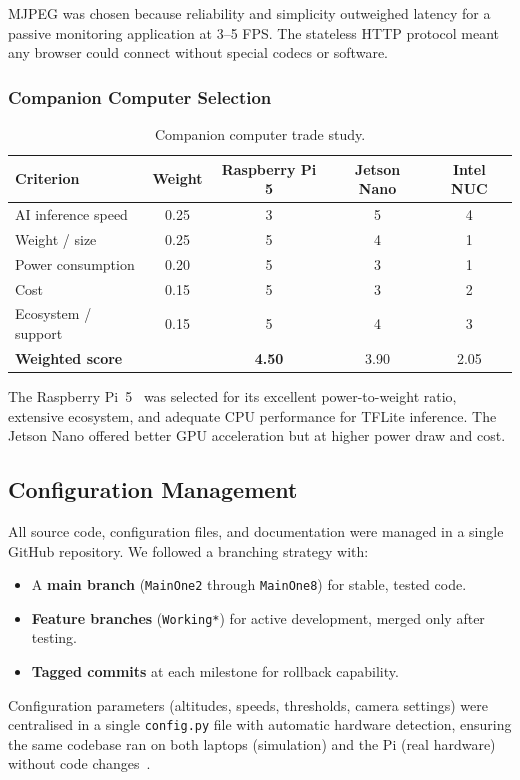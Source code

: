 MJPEG was chosen because reliability and simplicity outweighed latency for a passive monitoring application at 3--5 FPS. The stateless HTTP protocol meant any browser could connect without special codecs or software.

\subsubsection{Companion Computer Selection}

\begin{table}[htbp]
\centering
\compactTable
\caption{Companion computer trade study.}
\label{tab:companion_trade}
\begin{tabular}{l c c c c}
\toprule
\textbf{Criterion} & \textbf{Weight} & \textbf{Raspberry Pi 5} & \textbf{Jetson Nano} & \textbf{Intel NUC} \\
\midrule
AI inference speed & 0.25 & 3 & 5 & 4 \\
Weight / size & 0.25 & 5 & 4 & 1 \\
Power consumption & 0.20 & 5 & 3 & 1 \\
Cost & 0.15 & 5 & 3 & 2 \\
Ecosystem / support & 0.15 & 5 & 4 & 3 \\
\midrule
\textbf{Weighted score} & & \textbf{4.50} & 3.90 & 2.05 \\
\bottomrule
\end{tabular}
\end{table}

The Raspberry Pi~5~\cite{raspberrypi5} was selected for its excellent power-to-weight ratio, extensive ecosystem, and adequate CPU performance for TFLite inference. The Jetson Nano offered better GPU acceleration but at higher power draw and cost.

\subsection{Configuration Management}

All source code, configuration files, and documentation were managed in a single GitHub repository. We followed a branching strategy with:

\begin{itemize}
  \item A \textbf{main branch} (\texttt{MainOne2} through \texttt{MainOne8}) for stable, tested code.
  \item \textbf{Feature branches} (\texttt{Working*}) for active development, merged only after testing.
  \item \textbf{Tagged commits} at each milestone for rollback capability.
\end{itemize}

Configuration parameters (altitudes, speeds, thresholds, camera settings) were centralised in a single \texttt{config.py} file with automatic hardware detection, ensuring the same codebase ran on both laptops (simulation) and the Pi (real hardware) without code changes~\cite{chacon2014pro}.
